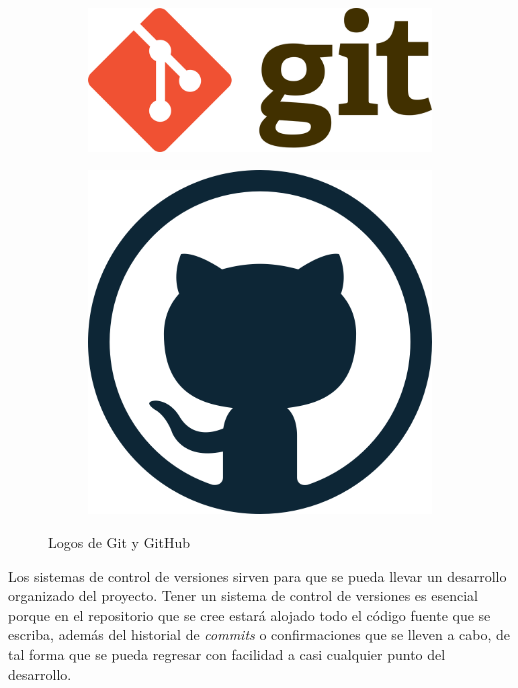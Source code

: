 \begin{figure}[ht]
    \centering
    \begin{subfigure}[b]{0.15\textwidth}
        \includegraphics[width=\textwidth]{mem/images/cap-4/4.1.2(desarrollo)/git-logo.png}
        \label{fig:git}
    \end{subfigure}
    \quad
    \begin{subfigure}[b]{0.1\textwidth}
        \includegraphics[width=\textwidth]{mem/images/cap-4/4.1.2(desarrollo)/github-logo.png}
        \label{fig:github}
    \end{subfigure}
    \caption{Logos de Git y GitHub}\label{fig:animals}
\end{figure}

Los sistemas de control de versiones sirven para que se pueda llevar un desarrollo organizado del proyecto. Tener un sistema de control de versiones es esencial porque en el repositorio que se cree estará alojado todo el código fuente que se escriba, además del historial de \textit{commits} o confirmaciones que se lleven a cabo, de tal forma que se pueda regresar con facilidad a casi cualquier punto del desarrollo. \\


